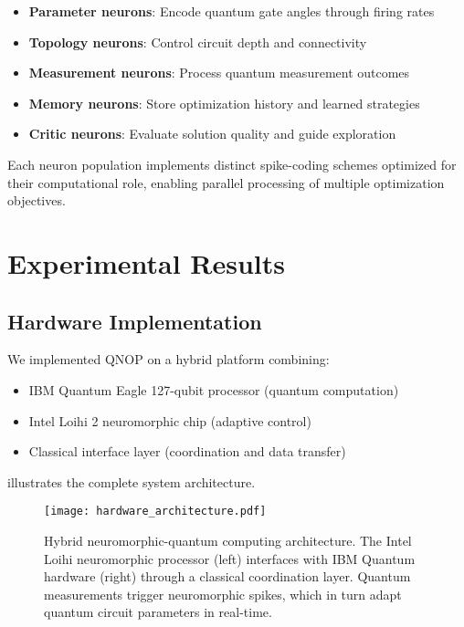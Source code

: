 \documentclass[arxiv,final,oneside,onecolumn]{arxiv-preprint-simple}
\begin{document}
\begin{itemize}
\item \textbf{Parameter neurons}: Encode quantum gate angles through firing rates
\item \textbf{Topology neurons}: Control circuit depth and connectivity  
\item \textbf{Measurement neurons}: Process quantum measurement outcomes
\item \textbf{Memory neurons}: Store optimization history and learned strategies
\item \textbf{Critic neurons}: Evaluate solution quality and guide exploration
\end{itemize}

Each neuron population implements distinct spike-coding schemes optimized for their computational role, enabling parallel processing of multiple optimization objectives.

\section{Experimental Results}

\subsection{Hardware Implementation}

We implemented QNOP on a hybrid platform combining:
\begin{itemize}
\item IBM Quantum Eagle 127-qubit processor (quantum computation)
\item Intel Loihi 2 neuromorphic chip (adaptive control)
\item Classical interface layer (coordination and data transfer)
\end{itemize}

 illustrates the complete system architecture.

\begin{figure}[htbp]
\centering
\texttt{[image: hardware\_architecture.pdf]}
\caption{Hybrid neuromorphic-quantum computing architecture. The Intel Loihi neuromorphic processor (left) interfaces with IBM Quantum hardware (right) through a classical coordination layer. Quantum measurements trigger neuromorphic spikes, which in turn adapt quantum circuit parameters in real-time.}
\label{fig:hardware_architecture}
\end{figure}
\end{document}
